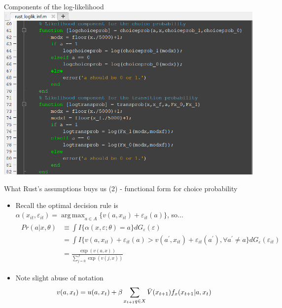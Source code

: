\documentclass[aspectratio=169]{beamer}
\DeclareMathOperator*{\argmax}{arg\,max}
\begin{document}
	\begin{frame}{Components of the log-likelihood}
		\includegraphics[width=\textwidth]{figs/5_loglik_components.PNG}
	\end{frame}
	
	
	\begin{frame}{What Rust's assumptions buys us (2) - functional form for choice probability}
		\begin{itemize}
			\itemsep1em
			\item Recall the optimal decision rule is $\alpha(x_{it},\varepsilon_{it}) = \argmax_{a \in A} \{v(a,x_{it}) + \varepsilon_{it}(a)\}$, so...
			\begin{align}
				\begin{split}
					Pr(a|x,\theta) &\equiv \int I\{\alpha(x,\varepsilon;\theta) = a\} dG_\varepsilon(\varepsilon) \\
					&= \int I\{v(a,x_{it}) + \varepsilon_{it}(a) > v(a^\prime, x_{it}) + \varepsilon_{it}(a^\prime), \forall a^\prime \neq a\} dG_\varepsilon(\varepsilon_{it}) \\
					&= \frac{\exp(v(a,x))}{\sum_{j=0}^J\exp(v(j,x))}
				\end{split}
			\end{align}
			\item Note slight abuse of notation
			\begin{equation*}
				v(a,x_t) = u(a,x_t) + \beta \sum_{x_{t+1}q \in X} \Bar{V}(x_{t+1}) f_x(x_{t+1}|a,x_t) 
			\end{equation*}
		\end{itemize}
	\end{frame}
	
\end{document}

